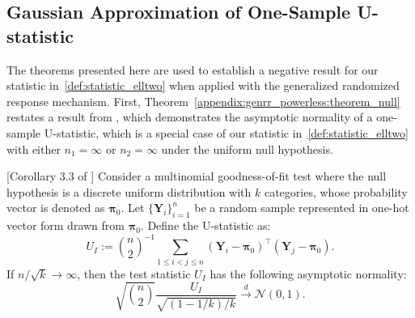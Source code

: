 \documentclass[twoside,11pt]{article}
\newcommand{\alphabetSize}{k} %
\newcommand{\sampleSize}{n}
\begin{document}
\begin{appendix}
	\subsection{Gaussian Approximation of One-Sample U-statistic}
	The theorems presented here are used to establish a negative result for our statistic in~\eqref{def:statistic_elltwo} when applied with the generalized randomized response mechanism. First, Theorem~\ref{appendix:genrr_powerless:theorem_null} restates a result from \citet{kim_multinomial_2020}, which demonstrates the asymptotic normality of a one-sample U-statistic, which is a special case of our statistic in~\eqref{def:statistic_elltwo} with either $n_1 = \infty$ or $n_2 = \infty$ under the uniform null hypothesis.
	\begin{theorem}\label{appendix:genrr_powerless:theorem_null}[Corollary 3.3 of \citet{kim_multinomial_2020}]
		Consider a multinomial goodness-of-fit test where the null hypothesis is a discrete uniform distribution with $\alphabetSize$ categories, whose probability vector is denoted as $\boldsymbol{\pi}_0$. Let $\{\mathbf{Y}_i \}_{i=1}^\sampleSize$ be a random sample represented in one-hot vector form drawn from $\boldsymbol{\pi}_0$. Define the U-statistic as:
		\begin{equation}\label{def:U_stat_kim_2020}
			U_I
			:=
			{\binom{n}{2}}^{-1} \sum_{1 \leq i < j \leq n} (\mathbf{Y}_i - \boldsymbol{\pi}_0)^\top (\mathbf{Y}_j - \boldsymbol{\pi}_0). 
		\end{equation}
		If $\sampleSize / \sqrt{\alphabetSize} \to \infty$, then the test statistic $U_I$ has the following asymptotic normality:
		\begin{equation*}
			\sqrt{\binom{n}{2}} \frac{U_I}{
				\sqrt{
					(1 - 1/\alphabetSize)/
					\alphabetSize
			}} \overset{d}{\longrightarrow} \mathcal{N}(0, 1).   
		\end{equation*}
	\end{theorem}
	

\end{appendix}
\end{document}
